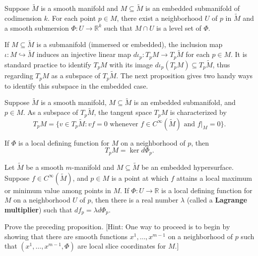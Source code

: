 \begin{proposition}
\label{prop:existence-local-defining-functions}
Suppose $\tilde{M}$ is a smooth manifold and $M \subseteq \tilde{M}$ is an embedded submanifold of codimension $k$. For each point $p \in M$, there exist a neighborhood $U$ of $p$ in $\tilde{M}$ and a smooth submersion $\Phi: U \to \mathbb{R}^k$ such that $M \cap U$ is a level set of $\Phi$.
\end{proposition}

If $M \subseteq \tilde{M}$ is a submanifold (immersed or embedded), the inclusion map $\iota: M \hookrightarrow \tilde{M}$ induces an injective linear map $d\iota_p : T_p M \to T_p \tilde{M}$ for each $p \in M$. It is standard practice to identify $T_p M$ with its image $d\iota_p(T_p M) \subseteq T_p \tilde{M}$, thus regarding $T_p M$ as a subspace of $T_p \tilde{M}$. The next proposition gives two handy ways to identify this subspace in the embedded case.

\begin{proposition}
\label{prop:tangent-space-submanifold}
Suppose $\tilde{M}$ is a smooth manifold, $M \subseteq \tilde{M}$ is an embedded submanifold, and $p \in M$. As a subspace of $T_p \tilde{M}$, the tangent space $T_p M$ is characterized by
\[
T_p M = \{v \in T_p \tilde{M} : vf = 0 \text{ whenever } f \in C^\infty(\tilde{M}) \text{ and } f|_M = 0\}.
\]

If $\Phi$ is a local defining function for $M$ on a neighborhood of $p$, then
\[
T_p M = \ker d\Phi_p.
\]
\end{proposition}

\begin{proposition}
\label{prop:lagrange-multiplier-rule}
Let $\tilde{M}$ be a smooth $m$-manifold and $M \subseteq \tilde{M}$ be an embedded hypersurface. Suppose $f \in C^\infty(\tilde{M})$, and $p \in M$ is a point at which $f$ attains a local maximum or minimum value among points in $M$. If $\Phi: U \to \mathbb{R}$ is a local defining function for $M$ on a neighborhood $U$ of $p$, then there is a real number $\lambda$ (called a \textbf{Lagrange multiplier}) such that $df_p = \lambda d\Phi_p$.
\end{proposition}

\begin{exercise}
\label{exer:prove-lagrange-multiplier}
Prove the preceding proposition. [Hint: One way to proceed is to begin by showing that there are smooth functions $x^1, \ldots, x^{m-1}$ on a neighborhood of $p$ such that $(x^1, \ldots, x^{m-1}, \Phi)$ are local slice coordinates for $M$.]
\end{exercise}

